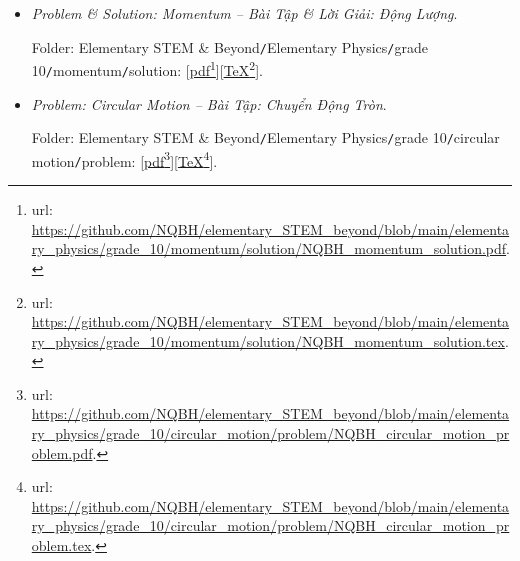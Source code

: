 \documentclass[12pt]{article}
\begin{document}
\begin{itemize}
	PDF: {\sc url}: \url{https://github.com/NQBH/elementary_STEM_beyond/blob/main/elementary_physics/grade_10/momentum/problem/NQBH_momentum_problem.pdf}.
	
	Folder: {\sf Elementary STEM \& Beyond{\tt/}Elementary Physics{\tt/}grade 10{\tt/}momentum{\tt/}problem}: [\href{https://github.com/NQBH/elementary_STEM_beyond/blob/main/elementary_physics/grade_10/momentum/problem/NQBH_momentum_problem.pdf}{pdf}\footnote{{\sc url}: \url{https://github.com/NQBH/elementary_STEM_beyond/blob/main/elementary_physics/grade_10/momentum/problem/NQBH_momentum_problem.pdf}.}][\href{https://github.com/NQBH/elementary_STEM_beyond/blob/main/elementary_physics/grade_10/momentum/problem/NQBH_momentum_problem.tex}{\TeX}\footnote{{\sc url}: \url{https://github.com/NQBH/elementary_STEM_beyond/blob/main/elementary_physics/grade_10/momentum/problem/NQBH_momentum_problem.tex}.}].
	
	\item {\it Problem \& Solution: Momentum -- Bài Tập \& Lời Giải: Động Lượng}.
	
	Folder: {\sf Elementary STEM \& Beyond{\tt/}Elementary Physics{\tt/}grade 10{\tt/}momentum{\tt/}solution}: [\href{https://github.com/NQBH/elementary_STEM_beyond/blob/main/elementary_physics/grade_10/momentum/solution/NQBH_momentum_solution.pdf}{pdf}\footnote{{\sc url}: \url{https://github.com/NQBH/elementary_STEM_beyond/blob/main/elementary_physics/grade_10/momentum/solution/NQBH_momentum_solution.pdf}.}][\href{https://github.com/NQBH/elementary_STEM_beyond/blob/main/elementary_physics/grade_10/momentum/solution/NQBH_momentum_solution.tex}{\TeX}\footnote{{\sc url}: \url{https://github.com/NQBH/elementary_STEM_beyond/blob/main/elementary_physics/grade_10/momentum/solution/NQBH_momentum_solution.tex}.}].
	\item {\it Problem: Circular Motion -- Bài Tập: Chuyển Động Tròn}.
	
	Folder: {\sf Elementary STEM \& Beyond{\tt/}Elementary Physics{\tt/}grade 10{\tt/}circular motion{\tt/}problem}: [\href{https://github.com/NQBH/elementary_STEM_beyond/blob/main/elementary_physics/grade_10/circular_motion/problem/NQBH_circular_motion_problem.pdf}{pdf}\footnote{{\sc url}: \url{https://github.com/NQBH/elementary_STEM_beyond/blob/main/elementary_physics/grade_10/circular_motion/problem/NQBH_circular_motion_problem.pdf}.}][\href{https://github.com/NQBH/elementary_STEM_beyond/blob/main/elementary_physics/grade_10/circular_motion/problem/NQBH_circular_motion_problem.tex}{\TeX}\footnote{{\sc url}: \url{https://github.com/NQBH/elementary_STEM_beyond/blob/main/elementary_physics/grade_10/circular_motion/problem/NQBH_circular_motion_problem.tex}.}].
	

\end{itemize}
\end{document}
